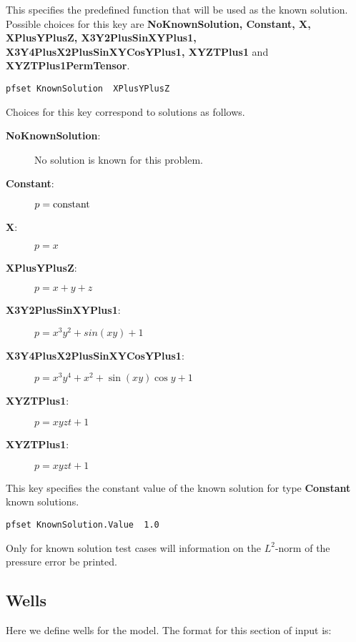{This specifies the predefined function that will be used as the known
solution.  Possible choices for this key are {\bf NoKnownSolution, Constant, 
X, XPlusYPlusZ, X3Y2PlusSinXYPlus1, X3Y4PlusX2PlusSinXYCosYPlus1, XYZTPlus1}
and {\bf XYZTPlus1PermTensor}.
}
\begin{display}\begin{verbatim}
pfset KnownSolution  XPlusYPlusZ
\end{verbatim}\end{display}
Choices for this key correspond to solutions as follows.
\begin{description}
\item[{\bf NoKnownSolution}: ] No solution is known for this problem.
\item[{\bf Constant}: ] $p = {\rm constant}$
\item[{\bf X}: ] $p = x$
\item[{\bf XPlusYPlusZ}: ] $p = x + y + z$
\item[{\bf X3Y2PlusSinXYPlus1}: ] $p = x^3 y^2 + sin(xy) + 1$
\item[{\bf X3Y4PlusX2PlusSinXYCosYPlus1}: ] 
$p = x^3 y^4 + x^2 + \sin(xy)\cos y + 1$
\item[{\bf XYZTPlus1}: ] $p = xyzt + 1$
\item[{\bf XYZTPlus1}: ] $p = xyzt + 1$
\end{description}

{This key specifies the constant value of the known solution for type 
{\bf Constant} known solutions.
}
\begin{display}\begin{verbatim}
pfset KnownSolution.Value  1.0
\end{verbatim}\end{display}

Only for known solution test cases will information on the $L^2$-norm
of the pressure error be printed.


\subsection{Wells}
\label{Wells}

Here we define wells for the model.  The format for this section of
input is:

